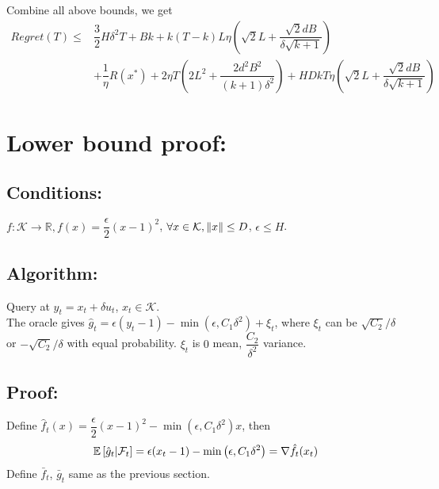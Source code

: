 \documentclass[11pt,letterpaper,english]{article}
\begin{document}
Combine all above bounds, we get
\begin{align*}
Regret(T) \leq& \dfrac{3}{2} H\delta^2T+ 
Bk + k(T-k)L \eta ( \sqrt{2}L+\dfrac{\sqrt{2}dB}{\delta\sqrt{k+1}} ) \\
&+ \dfrac{1}{\eta} R(x^*) + 2\eta T (2L^2+ \dfrac{2d^2B^2}{(k+1)\delta^2}) +HD kT \eta ( \sqrt{2}L+\dfrac{\sqrt{2}dB}{\delta\sqrt{k+1}} ) 
\end{align*}

\section*{Lower bound proof: }
\subsection*{Conditions: }
$f: \mathcal{K}\to \mathbb{R}, f(x) = \dfrac{\epsilon}{2}(x-1)^2$, $\forall x \in \mathcal{K}, \|x\| \leq D$, $\epsilon \leq H$.

\subsection*{Algorithm: }
Query at $y_t = x_t + \delta u_t$, $x_t \in \mathcal{K}$. \\
The oracle gives $\hat{g}_t = \epsilon (y_t - 1)-\min\left( \epsilon, C_1\delta^2  \right)+\xi_t $, where $\xi_t$ can be $\sqrt{C_2}/\delta$ or $-\sqrt{C_2}/\delta$ with equal probability. $\xi_t$ is $0$ mean, $\dfrac{C_2}{\delta^2}$ variance.

\subsection*{Proof: }
Define $\hat{f}_t(x) = \dfrac{\epsilon}{2}(x-1)^2-\min\left( \epsilon, C_1\delta^2   \right)x$, then 
\begin{align*}
\mathbb{E}\left[\hat{g}_t | \mathcal{F}_t \right]= \epsilon (x_t - 1)-\min\left( \epsilon, C_1\delta^2  \right) = \nabla \hat{f}_t(x_t)
\end{align*}
Define $\bar{f}_t $, $\bar{g}_t $ same as the previous section. 
\end{document}
